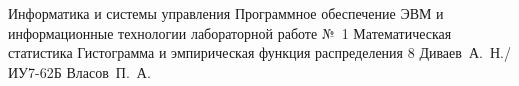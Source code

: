 \documentclass[a4paper,oneside,14pt]{extarticle}
\begin{document}
\makereporttitle
    {Информатика и системы управления} %
    {Программное обеспечение ЭВМ и информационные технологии} %
    {лабораторной работе №~1} %
    {Математическая статистика} %
    {Гистограмма и эмпирическая функция распределения} %
    {8} %
    {Диваев~А.~Н./ИУ7-62Б} %
    {Власов~П.~А.} %

\setcounter{page}{2}




\end{document}
